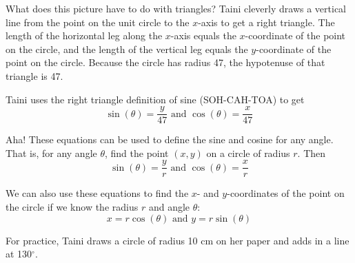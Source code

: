 What does this picture have to do with triangles?  Taini cleverly draws a vertical line from the point on the unit circle to the $x$-axis to get a right triangle. The length of the horizontal leg along the $x$-axis equals the $x$-coordinate of the point on the circle, and the length of the vertical leg equals the $y$-coordinate of the point on the circle. Because the circle has radius 47, the hypotenuse of that triangle is 47.

Taini uses the right triangle definition of sine (SOH-CAH-TOA) to get $$\sin(\theta) = \frac{y}{47} \text{ and } \cos(\theta) = \frac{x}{47}$$

Aha!  These equations can be used to define the sine and cosine for any angle.  That is, for any angle $\theta$, find the point $(x,y)$ on a circle of radius $r$.  Then
$$\sin(\theta) = \frac{y}{r} \text{ and } \cos(\theta) = \frac{x}{r}$$

We can also use these equations to find the $x$- and $y$-coordinates of the point on the circle if we know the radius $r$ and angle $\theta$:
$$x = r\cos(\theta) \text{ and } y = r\sin(\theta)$$

For practice, Taini draws a circle of radius 10 cm on her paper and adds in a line at 130$^\circ$.  

